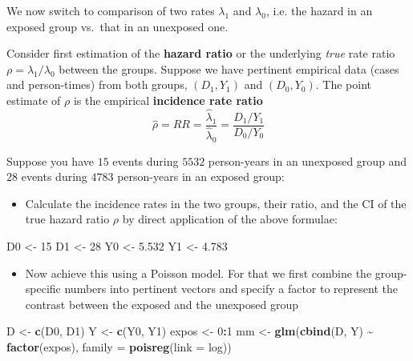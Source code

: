 \documentclass[
]{book}
\newenvironment{Shaded}{\begin{snugshade}}{\end{snugshade}}
\newcommand{\AttributeTok}[1]{\textcolor[rgb]{0.13,0.29,0.53}{#1}}
\newcommand{\DecValTok}[1]{\textcolor[rgb]{0.00,0.00,0.81}{#1}}
\newcommand{\FloatTok}[1]{\textcolor[rgb]{0.00,0.00,0.81}{#1}}
\newcommand{\FunctionTok}[1]{\textcolor[rgb]{0.13,0.29,0.53}{\textbf{#1}}}
\newcommand{\NormalTok}[1]{#1}
\newcommand{\OtherTok}[1]{\textcolor[rgb]{0.56,0.35,0.01}{#1}}
\newcommand{\SpecialCharTok}[1]{\textcolor[rgb]{0.81,0.36,0.00}{\textbf{#1}}}
\providecommand{\tightlist}{%
  \setlength{\itemsep}{0pt}\setlength{\parskip}{0pt}}
\begin{document}
We now switch to comparison of two rates \(\lambda_1\) and \(\lambda_0\), i.e.
the hazard in an exposed group vs.~that in an unexposed one.

Consider first estimation of the \textbf{hazard ratio} or the underlying \emph{true} rate ratio
\(\rho = \lambda_1/\lambda_0\) between the groups. Suppose we have
pertinent empirical data (cases and person-times) from both groups,
\((D_1,Y_1)\) and \((D_0,Y_0)\). The point estimate of \(\rho\) is the
empirical \textbf{incidence rate ratio}
\[
\widehat{\rho} = RR = \frac{\widehat\lambda_1}{\widehat\lambda_0} = \frac{D_1/Y_1}{D_0/Y_0}
\]

Suppose you have \(15\) events during \(5532\) person-years in an
unexposed group and \(28\) events during \(4783\) person-years in an
exposed group:

\begin{itemize}
\tightlist
\item
  Calculate the incidence rates in the two groups, their ratio, and the CI of the true hazard ratio \(\rho\) by direct application of the above formulae:
\end{itemize}

\begin{Shaded}
\begin{Highlighting}[]
\NormalTok{D0 }\OtherTok{\textless{}{-}} \DecValTok{15}
\NormalTok{D1 }\OtherTok{\textless{}{-}} \DecValTok{28}
\NormalTok{Y0 }\OtherTok{\textless{}{-}} \FloatTok{5.532}
\NormalTok{Y1 }\OtherTok{\textless{}{-}} \FloatTok{4.783}
\end{Highlighting}
\end{Shaded}

\begin{itemize}
\tightlist
\item
  Now achieve this using a Poisson model. For that we first combine
  the group-specific numbers into pertinent vectors and specify a factor to represent the contrast between the exposed and the unexposed group
\end{itemize}

\begin{Shaded}
\begin{Highlighting}[]
\NormalTok{D }\OtherTok{\textless{}{-}} \FunctionTok{c}\NormalTok{(D0, D1)}
\NormalTok{Y }\OtherTok{\textless{}{-}} \FunctionTok{c}\NormalTok{(Y0, Y1)}
\NormalTok{expos }\OtherTok{\textless{}{-}} \DecValTok{0}\SpecialCharTok{:}\DecValTok{1}
\NormalTok{mm }\OtherTok{\textless{}{-}} \FunctionTok{glm}\NormalTok{(}\FunctionTok{cbind}\NormalTok{(D, Y) }\SpecialCharTok{\textasciitilde{}} \FunctionTok{factor}\NormalTok{(expos), }\AttributeTok{family =} \FunctionTok{poisreg}\NormalTok{(}\AttributeTok{link =}\NormalTok{ log))}
\end{Highlighting}
\end{Shaded}
\end{document}

